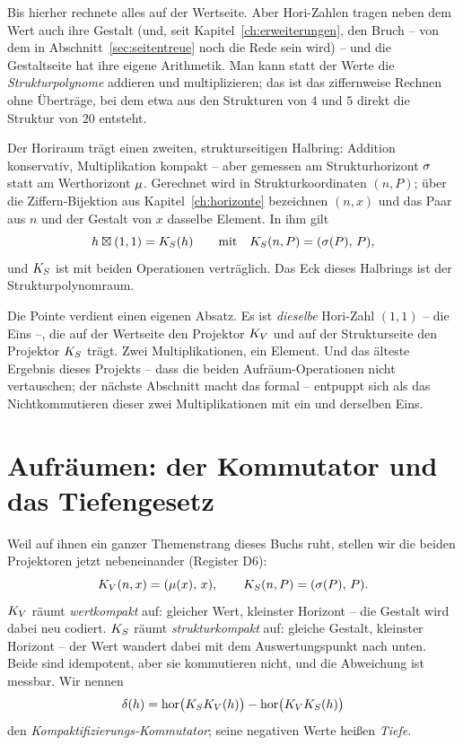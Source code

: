 Bis hierher rechnete alles auf der Wertseite. Aber Hori-Zahlen
tragen neben dem Wert auch ihre Gestalt (und, seit
Kapitel~\ref{ch:erweiterungen}, den Bruch -- von dem in
Abschnitt~\ref{sec:seitentreue} noch die Rede sein wird) -- und die Gestaltseite hat
ihre eigene Arithmetik. Man
kann statt der Werte die \emph{Strukturpolynome} addieren und
multiplizieren; das ist das ziffernweise Rechnen ohne Überträge, bei
dem etwa aus den Strukturen von $4$ und $5$ direkt die Struktur von
$20$ entsteht.

\begin{satz}[Dualitätssatz]\label{satz:dualitaet}
Der Horiraum trägt einen zweiten, strukturseitigen Halbring: Addition
konservativ, Multiplikation kompakt -- aber gemessen am
Strukturhorizont $\sigma$ statt am Werthorizont $\mu$. Gerechnet
wird in Strukturkoordinaten $(n,P)$; über die Ziffern-Bijektion aus
Kapitel~\ref{ch:horizonte} bezeichnen $(n,x)$ und das Paar aus $n$
und der Gestalt von $x$ dasselbe Element. In ihm gilt
\[
h\boxtimes(1,1)=K_S(h)
\qquad\text{mit}\quad
K_S(n,P)=(\sigma(P),\,P),
\]
und $K_S$ ist mit beiden Operationen verträglich. Das Eck dieses
Halbrings ist der Strukturpolynomraum.
\end{satz}

Die Pointe verdient einen eigenen Absatz. Es ist \emph{dieselbe}
Hori-Zahl $(1,1)$ -- die Eins --, die auf der Wertseite den Projektor
$K_V$ und auf der Strukturseite den Projektor $K_S$ trägt. Zwei
Multiplikationen, ein Element. Und das älteste Ergebnis dieses
Projekts -- dass die beiden Aufräum-Operationen nicht vertauschen;
der nächste Abschnitt macht das formal -- entpuppt sich als das
Nichtkommutieren dieser zwei Multiplikationen mit ein und derselben
Eins.

\section{Aufräumen: der Kommutator und das Tiefengesetz}
\label{sec:kommutator}

Weil auf ihnen ein ganzer Themenstrang dieses Buchs ruht, stellen
wir die beiden Projektoren jetzt nebeneinander (Register D6):
\[
K_V(n,x)=(\mu(x),\,x),
\qquad
K_S(n,P)=(\sigma(P),\,P).
\]
$K_V$ räumt \emph{wertkompakt} auf: gleicher Wert, kleinster
Horizont -- die Gestalt wird dabei neu codiert. $K_S$ räumt
\emph{strukturkompakt} auf: gleiche Gestalt, kleinster Horizont --
der Wert wandert dabei mit dem Auswertungspunkt nach unten. Beide
sind idempotent, aber sie kommutieren nicht, und die Abweichung ist
messbar. Wir nennen
\[
\delta(h)=\operatorname{hor}\bigl(K_SK_V(h)\bigr)-\operatorname{hor}\bigl(K_VK_S(h)\bigr)
\]
den \emph{Kompaktifizierungs-Kommutator}; seine negativen Werte
heißen \emph{Tiefe}.

